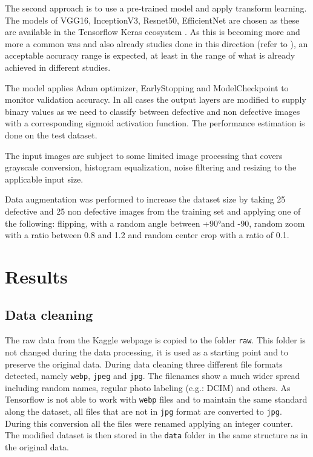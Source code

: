 \documentclass[10pt, final]{article}
\begin{document}
The second approach is to use a pre-trained model and apply transform learning.
The models of VGG16, InceptionV3, Resnet50, EfficientNet are chosen as these are available in the Tensorflow
Keras ecosystem \cite{keras_applications}.
As this is becoming more and more a common was and also already studies done in this direction
(refer to \cite{_railway_}), an acceptable accuracy range is expected, at least in the range of what is already
achieved in different studies.

The model applies Adam optimizer, EarlyStopping and ModelCheckpoint to monitor validation accuracy.
In all cases the output layers are modified to supply binary values as we need to classify between defective and
non defective images with a corresponding sigmoid activation function.
The performance estimation is done on the test dataset.

The input images are subject to some limited image processing that covers grayscale conversion, histogram equalization,
noise filtering and resizing to the applicable input size.

Data augmentation was performed to increase the dataset size by taking 25 defective and 25 non defective images
from the training set and applying one of the following: flipping, with a random angle between +90°and -90,
random zoom with a ratio between 0.8 and 1.2 and random center crop with a ratio of 0.1.

\section{Results} \label{sec:results}
\subsection{Data cleaning}
The raw data from the Kaggle webpage \cite{noauthor_railway_nodate} is copied to the folder \lstinline{raw}.
This folder is not changed during the data processing, it is used as a starting point and to preserve the
original data.
During data cleaning three different file formats detected, namely \lstinline{webp}, \lstinline{jpeg}
and \lstinline{jpg}.
The filenames show a much wider spread including random names, regular photo labeling (e.g.: DCIM) and others.
As Tensorflow is not able to work with \lstinline{webp} files and to maintain the same standard along
the dataset, all files that are not in \lstinline{jpg} format are converted to \lstinline{jpg}.
During this conversion all the files were renamed applying an integer counter.
The modified dataset is then stored in the \lstinline{data} folder in the same structure as in the original data.
\end{document}
